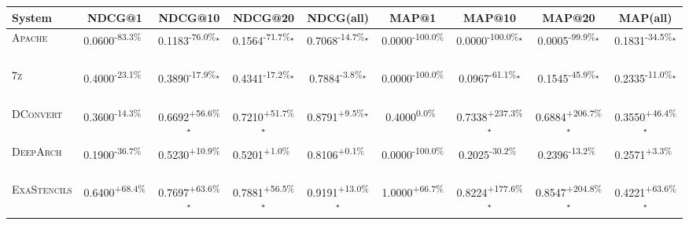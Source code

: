 \begin{table}[htbp]
\centering
\renewcommand{\arraystretch}{1.2}
\begin{tabular}{l|cccc|cccc}
\hline
System & NDCG@1 & NDCG@10 & NDCG@20 & NDCG(all) & MAP@1 & MAP@10 & MAP@20 & MAP(all) \\ \hline
\textsc{Apache} & \cellcolor{red!30}0.0600\textsuperscript{-83.3\%}$^{\,\,\,}$ & \cellcolor{red!30}0.1183\textsuperscript{-76.0\%}$^\star$ & \cellcolor{red!30}0.1564\textsuperscript{-71.7\%}$^\star$ & \cellcolor{red!30}0.7068\textsuperscript{-14.7\%}$^\star$ & \cellcolor{red!30}0.0000\textsuperscript{-100.0\%}$^{\,\,\,}$ & \cellcolor{red!30}0.0000\textsuperscript{-100.0\%}$^\star$ & \cellcolor{red!30}0.0005\textsuperscript{-99.9\%}$^\star$ & \cellcolor{red!30}0.1831\textsuperscript{-34.5\%}$^\star$ \\
\textsc{7z} & \cellcolor{red!30}0.4000\textsuperscript{-23.1\%}$^{\,\,\,}$ & \cellcolor{red!30}0.3890\textsuperscript{-17.9\%}$^\star$ & \cellcolor{red!30}0.4341\textsuperscript{-17.2\%}$^\star$ & \cellcolor{red!30}0.7884\textsuperscript{-3.8\%}$^\star$ & \cellcolor{red!30}0.0000\textsuperscript{-100.0\%}$^{\,\,\,}$ & \cellcolor{red!30}0.0967\textsuperscript{-61.1\%}$^\star$ & \cellcolor{red!30}0.1545\textsuperscript{-45.9\%}$^\star$ & \cellcolor{red!30}0.2335\textsuperscript{-11.0\%}$^\star$ \\
\textsc{DConvert} & \cellcolor{red!30}0.3600\textsuperscript{-14.3\%}$^{\,\,\,}$ & \cellcolor{green!30}0.6692\textsuperscript{+56.6\%}$^\star$ & \cellcolor{green!30}0.7210\textsuperscript{+51.7\%}$^\star$ & \cellcolor{green!30}0.8791\textsuperscript{+9.5\%}$^\star$ & \cellcolor{red!30}0.4000\textsuperscript{0.0\%}$^{\,\,\,}$ & \cellcolor{green!30}0.7338\textsuperscript{+237.3\%}$^\star$ & \cellcolor{green!30}0.6884\textsuperscript{+206.7\%}$^\star$ & \cellcolor{green!30}0.3550\textsuperscript{+46.4\%}$^\star$ \\
\textsc{DeepArch} & \cellcolor{red!30}0.1900\textsuperscript{-36.7\%}$^{\,\,\,}$ & \cellcolor{green!30}0.5230\textsuperscript{+10.9\%}$^{\,\,\,}$ & \cellcolor{green!30}0.5201\textsuperscript{+1.0\%}$^{\,\,\,}$ & \cellcolor{green!30}0.8106\textsuperscript{+0.1\%}$^{\,\,\,}$ & \cellcolor{red!30}0.0000\textsuperscript{-100.0\%}$^{\,\,\,}$ & \cellcolor{red!30}0.2025\textsuperscript{-30.2\%}$^{\,\,\,}$ & \cellcolor{red!30}0.2396\textsuperscript{-13.2\%}$^{\,\,\,}$ & \cellcolor{green!30}0.2571\textsuperscript{+3.3\%}$^{\,\,\,}$ \\
\textsc{ExaStencils} & \cellcolor{green!30}0.6400\textsuperscript{+68.4\%}$^{\,\,\,}$ & \cellcolor{green!30}0.7697\textsuperscript{+63.6\%}$^\star$ & \cellcolor{green!30}0.7881\textsuperscript{+56.5\%}$^\star$ & \cellcolor{green!30}0.9191\textsuperscript{+13.0\%}$^\star$ & \cellcolor{green!30}1.0000\textsuperscript{+66.7\%}$^{\,\,\,}$ & \cellcolor{green!30}0.8224\textsuperscript{+177.6\%}$^\star$ & \cellcolor{green!30}0.8547\textsuperscript{+204.8\%}$^\star$ & \cellcolor{green!30}0.4221\textsuperscript{+63.6\%}$^\star$ \\

\end{tabular}
\end{table}
